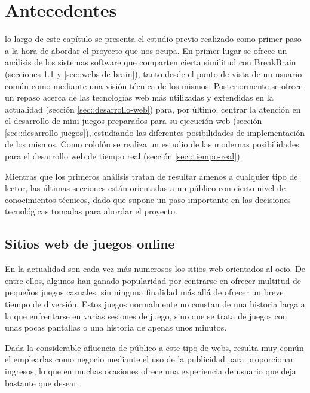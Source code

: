 \chapter{Antecedentes}
\label{chap:antecedentes}

 lo largo de este capítulo se presenta el estudio previo realizado como primer paso a la hora de abordar el proyecto que nos ocupa. En primer lugar se ofrece un análisis de los sistemas software que comparten cierta similitud con BreakBrain (secciones \ref{sec::webs-de-juegos} y \ref{sec::webs-de-brain}), tanto desde el punto de vista de un usuario común como mediante una visión técnica de los mismos. Posteriormente se ofrece un repaso acerca de las tecnologías web más utilizadas y extendidas en la actualidad (sección \ref{sec::desarrollo-web}) para, por último, centrar la atención en el desarrollo de mini-juegos preparados para su ejecución web (sección \ref{sec::desarrollo-juegos}), estudiando las diferentes posibilidades de implementación de los mismos. Como colofón se realiza un estudio de las modernas posibilidades para el desarrollo web de tiempo real (sección \ref{sec::tiempo-real}).

Mientras que los primeros análisis tratan de resultar amenos a cualquier tipo de lector, las últimas secciones están orientadas a un público con cierto nivel de conocimientos técnicos, dado que supone un paso importante en las decisiones tecnológicas tomadas para abordar el proyecto.

\section{Sitios web de juegos online}
\label{sec::webs-de-juegos}

En la actualidad son cada vez más numerosos los sitios web orientados al ocio. De entre ellos, algunos han ganado popularidad por centrarse en ofrecer multitud de pequeños juegos casuales, sin ninguna finalidad más allá de ofrecer un breve tiempo de diversión. Estos juegos normalmente no constan de una historia larga a la que enfrentarse en varias sesiones de juego, sino que se trata de juegos con unas pocas pantallas o una historia de apenas unos minutos.

Dada la considerable afluencia de público a este tipo de webs, resulta muy común el emplearlas como negocio mediante el uso de la publicidad para proporcionar ingresos, lo que en muchas ocasiones ofrece una experiencia de usuario que deja bastante que desear.

